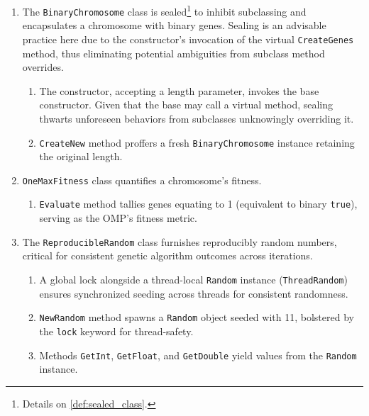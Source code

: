   \begin{enumerate}
    \item[1-8] The \texttt{BinaryChromosome} class is sealed\footnote{
        Details on \vref{def:sealed_class}.
      } to inhibit subclassing and encapsulates a chromosome with binary genes. 
      Sealing is an advisable practice here due to the constructor's invocation 
      of the virtual \texttt{CreateGenes} method, thus eliminating potential 
      ambiguities from subclass method overrides.
      \begin{enumerate}
        \item[2-4] The constructor, accepting a length parameter, invokes the 
          base constructor.
          Given that the base may call a virtual method, sealing thwarts 
          unforeseen behaviors from subclasses unknowingly overriding it.
        \item[4-7] \texttt{CreateNew} method proffers a fresh 
          \texttt{BinaryChromosome} instance retaining the original length.
      \end{enumerate}
    \item[9-13] \texttt{OneMaxFitness} class quantifies a chromosome's fitness.
      \begin{enumerate}
        \item[10-12] \texttt{Evaluate} method tallies genes equating to 1 
          (equivalent to binary \texttt{true}), serving as the OMP's fitness metric.
      \end{enumerate}
    \item[14-35] The \texttt{ReproducibleRandom} class furnishes 
      reproducibly random numbers, critical for consistent genetic algorithm 
      outcomes across iterations.
      \begin{enumerate}
        \item[15-17] A global lock alongside a thread-local 
          \texttt{Random} instance 
          (\texttt{ThreadRandom}) ensures synchronized seeding 
          across threads for consistent randomness.
        \item[18-22] \texttt{NewRandom} method spawns a 
          \texttt{Random} object seeded with 11, bolstered by the 
          \texttt{lock} keyword for thread-safety.
        \item[23-34] Methods \texttt{GetInt}, 
          \texttt{GetFloat}, and \texttt{GetDouble} 
          yield values from the \texttt{Random} instance.

\end{enumerate}
\end{enumerate}
